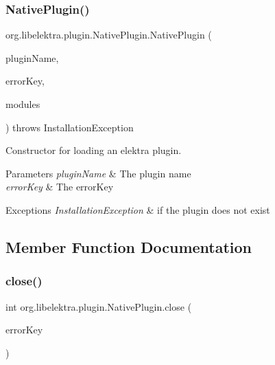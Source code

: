 \subsubsection{\texorpdfstring{Native\+Plugin()}{NativePlugin()}}
{\footnotesize\ttfamily org.\+libelektra.\+plugin.\+Native\+Plugin.\+Native\+Plugin (\begin{DoxyParamCaption}\item[{String}]{plugin\+Name,  }\item[{\hyperlink{classorg_1_1libelektra_1_1Key}{Key}}]{error\+Key,  }\item[{\hyperlink{classorg_1_1libelektra_1_1KeySet}{Key\+Set}}]{modules }\end{DoxyParamCaption}) throws Installation\+Exception\hspace{0.3cm}{\ttfamily [inline]}}



Constructor for loading an elektra plugin. 


\begin{DoxyParams}{Parameters}
{\em plugin\+Name} & The plugin name \\
\hline
{\em error\+Key} & The error\+Key \\
\hline
\end{DoxyParams}

\begin{DoxyExceptions}{Exceptions}
{\em Installation\+Exception} & if the plugin does not exist \\
\hline
\end{DoxyExceptions}


\subsection{Member Function Documentation}
\mbox{\label{classorg_1_1libelektra_1_1plugin_1_1NativePlugin_acd6f4e0e81a11a1eba64dfa164c67a1f}} 
\subsubsection{\texorpdfstring{close()}{close()}}
{\footnotesize\ttfamily int org.\+libelektra.\+plugin.\+Native\+Plugin.\+close (\begin{DoxyParamCaption}\item[{\hyperlink{classorg_1_1libelektra_1_1Key}{Key}}]{error\+Key }\end{DoxyParamCaption})\hspace{0.3cm}{\ttfamily [inline]}}



